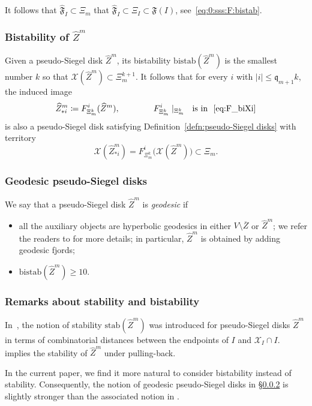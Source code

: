 \documentclass{amsart}
\newcommand{\1}{{\mathbb 1 }}
\newcommand{\stab}{{\text{stab}}}
\newcommand{\bistab}{{\text{bistab}}}
\newcommand\XX{\mathcal{X}}
\newcommand{\wZ}{{\widehat Z}}
\newcommand{\qq}{\mathfrak{q}}
\theoremstyle{remark}
\numberwithin{equation}{section}
\theoremstyle{definition}
\begin{document}
It follows that $\widehat{\mathfrak F}_I\subset \Xi_m$ that $\widehat{\mathfrak F}_I\subset \Xi_I\subset \mathfrak F(I)$, see~\eqref{eq:0:sss:F:bistab}.







\subsubsection{Bistability of $\wZ^m$}\label{sss:dfn:bistable} Given a pseudo-Siegel disk $\wZ^m$, its bistability $\bistab(\wZ^m)$ is the smallest number $k$ so that $\XX(\wZ^m)\subset \Xi_m^{k+1}$. It follows that for every $i$ with $|i|\le \qq_{m+1}k$, the induced image 
\begin{equation}
\label{eq:dfn:wZ_*i}
\wZ^m_{*i} \coloneqq F^i_{\Xi_m^k}(\wZ^m),\qquad\qquad   F^i_{\Xi_m^k}\mid_{\Xi_m^k}\ \ \text{is in ~\eqref{eq:F_biXi}}    
\end{equation}
 is also a pseudo-Siegel disk satisfying Definition~\ref{defn:pseudo-Siegel disks} with territory \[\XX(\wZ^m_{*i})= F^i_{\Xi_m^k}\big(\XX(\wZ^m)\big)\subset \Xi_m.\]


\subsubsection{Geodesic pseudo-Siegel disks}\label{sss:geodes:wZ} We say that a pseudo-Siegel disk $\wZ^m$ is \emph{geodesic} if
\begin{itemize}
    \item  all the auxiliary objects are hyperbolic geodesics in either $V \setminus \overline{Z}$ or $\wZ^m$; we refer the readers to \cite[\S~5.1.9]{DL22} for more details; in particular, $\wZ^m$ is obtained by adding geodesic fjords;
    \item $\bistab(\wZ^m)\ge 10$.
\end{itemize}

\subsubsection{Remarks about stability and bistability}\label{sss:rem:bistab} In~\cite[\S~5.1.8]{DL22}, the notion of stability $\stab(\wZ^m)$ was introduced for pseudo-Siegel disks $\wZ^m$ in terms of combinatorial distances between the endpoints of $I$ and $\XX_I\cap I$. \cite[Lemma 5.4]{DL22} implies the stability of $\wZ^m$ under pulling-back.


In the current paper, we find it more natural to consider bistability instead of stability. Consequently, the notion of geodesic pseudo-Siegel disks in \S\ref{sss:geodes:wZ} is slightly stronger than the associated notion in \cite[\S~5.1.9]{DL22}. 
\end{document}
